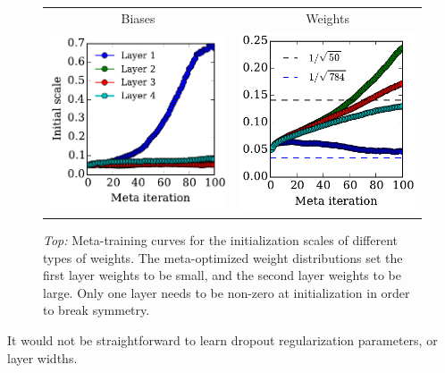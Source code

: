 \documentclass{article}
\begin{document}
\begin{figure}[h!]
\vskip 0.2in
\begin{center}
\begin{tabular}{cc}
 Biases & Weights \\
\hspace{-1em}\includegraphics[width=0.5\columnwidth, height=0.5\columnwidth]{../experiments/Feb_3_training_schedules/4_adam_100/init_bias_learning_curve.pdf} &
\hspace{-1em}\includegraphics[width=0.5\columnwidth, height=0.5\columnwidth]{../experiments/Feb_3_training_schedules/4_adam_100/init_weight_learning_curve.pdf}
\end{tabular}
\caption{\emph{Top:} Meta-training curves for the initialization scales of different types of weights.
The meta-optimized weight distributions set the first layer weights to be small, and the second layer weights to be large.
Only one layer needs to be non-zero at initialization in order to break symmetry.}
\label{fig:nn weight init scales}
\end{center}
\vskip -0.2in
\end{figure} 

It would not be straightforward to learn dropout regularization parameters, or layer widths.
\end{document}
